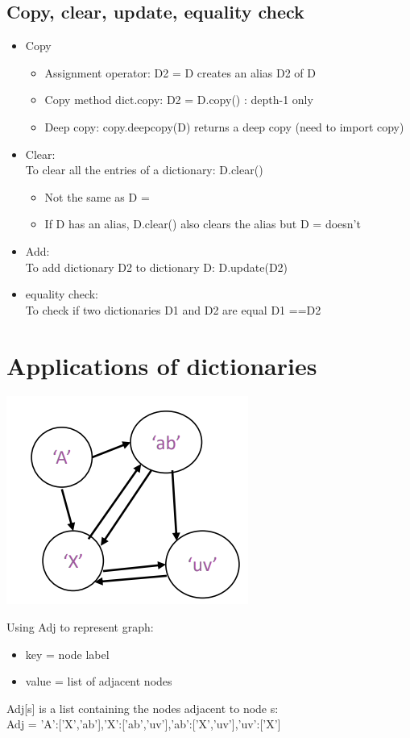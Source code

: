 \documentclass[12pt,oneside]{book}
\begin{document}
\subsection{Copy, clear, update, equality check}
\begin{itemize}
	\item Copy
	      \begin{itemize}
		      \item Assignment operator: D2 = D creates an alias D2 of D
		      \item Copy method dict.copy: D2 = D.copy() : depth-1 only
		      \item Deep copy: copy.deepcopy(D) returns a deep copy (need to import copy)
	      \end{itemize}
	\item Clear: \\
	      To clear all the entries of a dictionary: D.clear()
	      \begin{itemize}
		      \item Not the same as D = {}
		      \item If D has an alias, D.clear() also clears the alias but D = {} doesn’t
	      \end{itemize}
	\item Add: \\
	      To add dictionary D2 to dictionary D: D.update(D2)
	\item equality check:\\
	      To check if two dictionaries D1 and D2 are equal D1 ==D2
\end{itemize}
\section{Applications of dictionaries}
\begin{center}
	\includegraphics[width=0.3\linewidth]{../pic/python/19.png}
\end{center}
Using Adj to represent graph:
\begin{itemize}
	\item key = node label
	\item value = list of adjacent nodes
\end{itemize}
Adj[s] is a list containing the nodes adjacent to node s: \\
Adj = {'A':['X','ab'],'X':['ab','uv'],'ab':['X','uv'],'uv':['X']}
\end{document}
